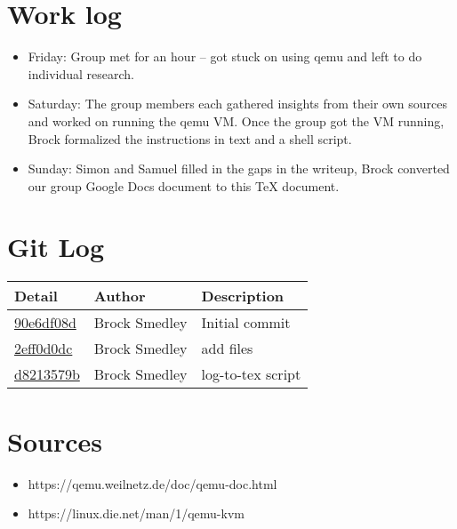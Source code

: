 \documentclass[10pt,a4paper]{report}
\begin{document}
	
	\section*{Work log}
	\begin{itemize}
		\item Friday: Group met for an hour -- got stuck on using qemu and left to do individual research.
		\item Saturday: The group members each gathered insights from their own sources and worked on running the qemu VM. Once the group got the VM running, Brock formalized the instructions in text and a shell script.
		\item Sunday: Simon and Samuel filled in the gaps in the writeup, Brock converted our group Google Docs document to this TeX document.
	\end{itemize}
	
	
	\section*{Git Log}
	\begin{tabular}{l l l}\textbf{Detail} & \textbf{Author} & \textbf{Description}\\\hline
		\href{https://github.com/BrockSmedley/os2-group28/commit/90e6df08d30c3f5f048eb7be774877d1609e99e5}{90e6df08d} & Brock Smedley & Initial commit\\\hline
		\href{https://github.com/BrockSmedley/os2-group28/commit/2eff0d0dc0c0d68fff787b5ed695fa87342f141a}{2eff0d0dc} & Brock Smedley & add files\\\hline
		\href{https://github.com/BrockSmedley/os2-group28/commit/d8213579b7b48a53b9fcb572713e87c6d36c6dd4}{d8213579b} & Brock Smedley & log-to-tex script\\\hline
	\end{tabular}
		
	
	\newpage
	\section*{Sources}
	\begin{itemize}
		\item https://qemu.weilnetz.de/doc/qemu-doc.html
		\item https://linux.die.net/man/1/qemu-kvm
	\end{itemize}
	
\end{document}
